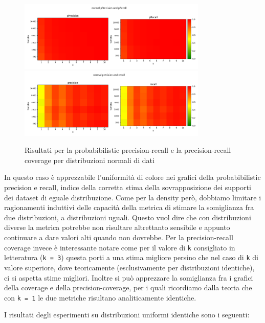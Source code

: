 \begin{figure}[!ht]
    \centering
    \includegraphics[width=0.8\textwidth]{../images/toyexperiments/kdim/normal_pPrecision_pRecall.png} 
    \includegraphics[width=0.8\textwidth]{../images/toyexperiments/kdim/normal_precision_recall.png} 
    \caption{Risultati per la probabibilistic precision-recall e la precision-recall coverage per distribuzioni normali di dati}
\end{figure}

In questo caso è apprezzabile l'uniformità di colore nei grafici della probabibilistic precision e recall, indice della corretta stima della sovrapposizione dei supporti dei dataset di eguale distribuzione.
Come per la density però, dobbiamo limitare i ragionamenti induttivi delle capacità della metrica di stimare la somiglianza fra due distribuzioni, a distribuzioni uguali. Questo vuol dire che con distribuzioni diverse la metrica potrebbe non risultare altrettanto sensibile e appunto continuare a dare valori alti quando non dovrebbe. 
Per la precision-recall coverage invece è interessante notare come per il valore di \texttt{k} consigliato in letteratura (\texttt{k = 3}) questa porti a una stima migliore persino che nel caso di \texttt{k} di valore superiore, dove teoricamente (esclusivamente per distribuzioni identiche), ci si aspetta stime migliori. 
Inoltre si può apprezzare la somiglianza fra i grafici della coverage e della precision-coverage, per i quali ricordiamo dalla teoria che con \texttt{k = 1} le due metriche risultano analiticamente identiche.

I risultati degli esperimenti su distribuzioni uniformi identiche sono i seguenti:

